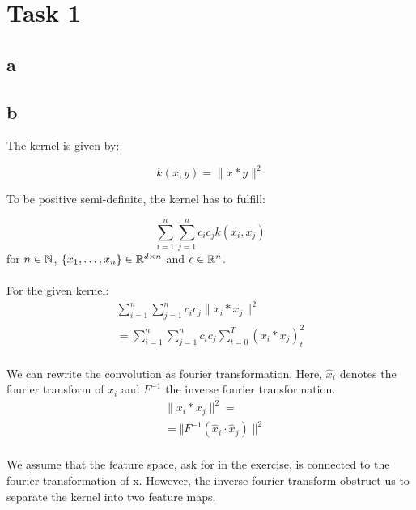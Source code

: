 \section*{Task 1}

\subsection*{a}


\subsection*{b}

The kernel is given by:

\begin{equation}
    k(x, y) = \lVert x * y \rVert ^ 2
\end{equation}

To be positive semi-definite, the kernel has to fulfill:

\begin{equation}
    \sum_{i=1}^n \sum_{j=1}^n c_i c_j k(x_i, x_j)
\end{equation}
for $n \in \mathbb{N}$, $\{x_1, \ldots, x_n\} \in \mathbb{R}^{d \times n} $ and $c \in \mathbb{R}^n$.
\\
\\
For the given kernel:
\begin{align}
    \sum_{i=1}^n \sum_{j=1}^n c_i c_j \lVert x_i * x_j \rVert ^ 2  \\
    = \sum_{i=1}^n \sum_{j=1}^n c_i c_j \sum_{t=0}^T (x_i * x_j)_t^2  \\
\end{align}

We can rewrite the convolution as fourier transformation.
Here, $\hat x_i $ denotes the fourier transform of $x_i$ and $F^{-1}$ the inverse
fourier transformation.
\begin{align}
    & \lVert x_i * x_j \rVert ^ 2 = \\
    &    = \Vert F^{-1}(\hat x_i \cdot  \hat x_j) \rVert ^ 2  \\
\end{align}

We assume that the feature space, ask for in the exercise, is connected to the
fourier transformation of x. However, the inverse fourier transform obstruct
us to separate the kernel into two feature maps.
